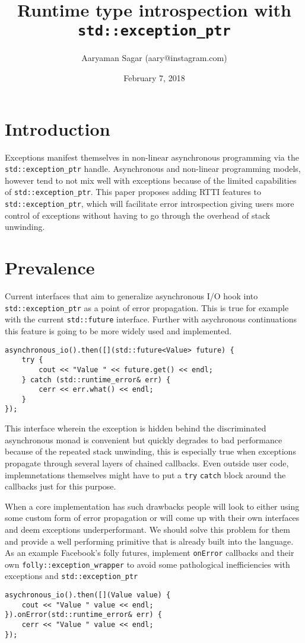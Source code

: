 \documentclass{article}
\begin{document}
\title{\textbf{Runtime type introspection with \texttt{std::exception\_ptr}}}
\author{Aaryaman Sagar (aary@instagram.com)}
\date{February 7, 2018}
\maketitle

\section{Introduction}
Exceptions manifest themselves in non-linear asynchronous programming via the
\texttt{std::exception\_ptr} handle.  Asynchronous and non-linear programming
models, however tend to not mix well with exceptions because of the limited
capabilities of \texttt{std::exception\_ptr}.  This paper proposes adding RTTI
features to \texttt{std::exception\_ptr}, which will facilitate error
introspection giving users more control of exceptions without having to go
through the overhead of stack unwinding.

\section{Prevalence}
Current interfaces that aim to generalize asynchronous I/O hook into
\texttt{std::exception\_ptr} as a point of error propagation.  This is true
for example with the current \texttt{std::future} interface.  Further with
asychronous continuations this feature is going to be more widely used and
implemented.
\begin{lstlisting}
asynchronous_io().then([](std::future<Value> future) {
    try {
        cout << "Value " << future.get() << endl;
    } catch (std::runtime_error& err) {
        cerr << err.what() << endl;
    }
});
\end{lstlisting}
This interface wherein the exception is hidden behind the discriminated
asynchronous monad is convenient but quickly degrades to bad performance
because of the repeated stack unwinding, this is especially true when
exceptions propagate through several layers of chained callbacks.  Even
outside user code, implemnetations themselves might have to put a \texttt{try}
\texttt{catch} block around the callbacks just for this purpose.

When a core implementation has such drawbacks people will look to either using
some custom form of error propagation or will come up with their own
interfaces and deem exceptions underperformant.  We should solve this problem
for them and provide a well performing primitive that is already built into
the language.  As an example Facebook's folly futures, implement
\texttt{onError} callbacks and their own \texttt{folly::exception\_wrapper} to
avoid some pathological inefficiencies with exceptions and
\texttt{std::exception\_ptr}
\begin{lstlisting}
asychronous_io().then([](Value value) {
    cout << "Value " value << endl;
}).onError(std::runtime_error& err) {
    cerr << "Value " value << endl;
});
\end{lstlisting}
\end{document}
